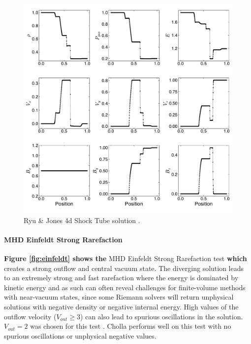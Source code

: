 \documentclass[modern, linenumbers]{aastex631}
\newcommand*{\img}[1]{%
    \raisebox{-.05\baselineskip}{%
        \texttt{[image: \#1]}%
    }%
}
\begin{document}
\begin{figure}[ht!]
    \includegraphics[width=\linewidth]{rj4d.pdf}
    \caption{Ryu \& Jones 4d Shock Tube solution \citep{ryu_jones_1995}.
    \href{https://zenodo.org/records/10927223}{\img{zenodo-gradient-200.png}}}
    \label{fig:rj-4d}
\end{figure}

\paragraph{MHD Einfeldt Strong Rarefaction}
\textbf{Figure \ref{fig:einfeldt} shows the} MHD Einfeldt Strong Rarefaction test \citep{einfeldt_1991} \textbf{which} creates a strong outflow and central vacuum state. The diverging solution leads to an extremely strong and fast rarefaction where the energy is dominated by kinetic energy and as such can often reveal challenges for finite-volume methods with near-vacuum states, since some Riemann solvers will return unphysical solutions with negative density or negative internal energy. High values of the outflow velocity ($V_{out}\ge3$) can also lead to spurious oscillations in the solution. $V_{out} = 2$ was chosen for this test \citep{charm_2011}. Cholla performs well on this test with no spurious oscillations or unphysical negative values.
\end{document}
